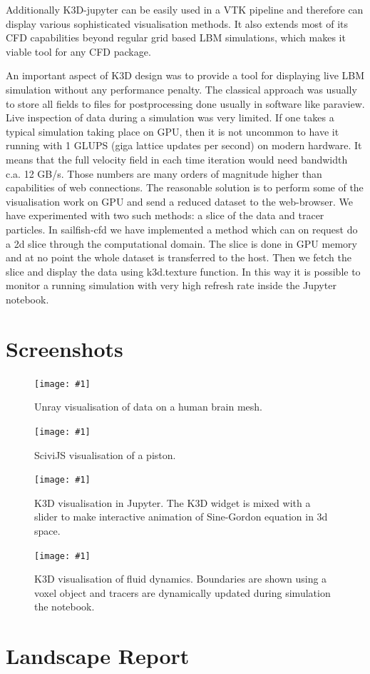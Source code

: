 \documentclass{deliverablereport}
\newcommand{\screenshot}[2]{
\begin{figure}[ht]
  \texttt{[image: \#1]}
  \caption{#2}
  \label{#1}
\end{figure}}
\begin{document}
Additionally K3D-jupyter can be easily used in a VTK pipeline and
therefore can display various sophisticated visualisation
methods. It also extends most of its CFD capabilities beyond regular
grid based LBM simulations, which makes it viable tool for any CFD
package.

An important aspect of K3D design was to provide a tool for
displaying live LBM simulation without any performance penalty. The
classical approach was usually to store all fields to files for
postprocessing done usually in software like paraview. Live inspection
of data during a simulation was very limited.  If one takes a typical
simulation taking place on GPU, then it is not uncommon to have it
running with 1 GLUPS (giga lattice updates per second) on modern
hardware. It means that the full velocity field in each time iteration
would need bandwidth c.a. 12 GB/s. Those numbers are many orders of
magnitude higher than capabilities of web connections.  The reasonable
solution is to perform some of the visualisation work on GPU and send a reduced
dataset to the web-browser. We have experimented with two such
methods: a slice of the data and tracer particles. In sailfish-cfd we
have implemented a method which can on request do a 2d slice through
the computational domain. The slice is done in GPU memory and at no
point the whole dataset is transferred to the host. Then we fetch the
slice and display the data using k3d.texture function. In this way it
is possible to monitor a running simulation with very high refresh
rate inside the Jupyter notebook.



\clearpage
\appendix
\section{Screenshots}\label{screenshots}

\screenshot{unray-brain.png}{Unray visualisation of data on a human brain mesh.}
\screenshot{scivijs.png}{SciviJS visualisation of a piston.}

\screenshot{k3d_3.png}{K3D visualisation in Jupyter. The K3D widget is
  mixed with a slider to make interactive animation of Sine-Gordon
  equation in 3d space.}

\screenshot{k3d_cfd2.png}{K3D visualisation of fluid
  dynamics. Boundaries are shown using a voxel object and tracers are
  dynamically updated during simulation the notebook.}


\clearpage
\section{Landscape Report}\label{landscape}

\end{document}
